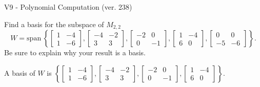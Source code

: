 \begin{exercise}
  \begin{exerciseTitle}V9 - Polynomial Computation (ver. 238)\end{exerciseTitle}
  \begin{exerciseStatement}
    Find a basis for the subspace of \(M_{2,2}\) 
\[W=\mathrm{span}\ \left\{\left[\begin{array}{cc}
1 & -4 \\
1 & -6
\end{array}\right] , \left[\begin{array}{cc}
-4 & -2 \\
3 & 3
\end{array}\right] , \left[\begin{array}{cc}
-2 & 0 \\
0 & -1
\end{array}\right] , \left[\begin{array}{cc}
1 & -4 \\
6 & 0
\end{array}\right] , \left[\begin{array}{cc}
0 & 0 \\
-5 & -6
\end{array}\right]\right\}.\]
 Be sure to explain why your result is a basis.


  \end{exerciseStatement}
  \begin{exerciseAnswer}
   A basis of \(W\) is  \(\left\{\left[\begin{array}{cc}
1 & -4 \\
1 & -6
\end{array}\right] , \left[\begin{array}{cc}
-4 & -2 \\
3 & 3
\end{array}\right] , \left[\begin{array}{cc}
-2 & 0 \\
0 & -1
\end{array}\right] , \left[\begin{array}{cc}
1 & -4 \\
6 & 0
\end{array}\right]\right\}\).
  


  \end{exerciseAnswer}
\end{exercise}